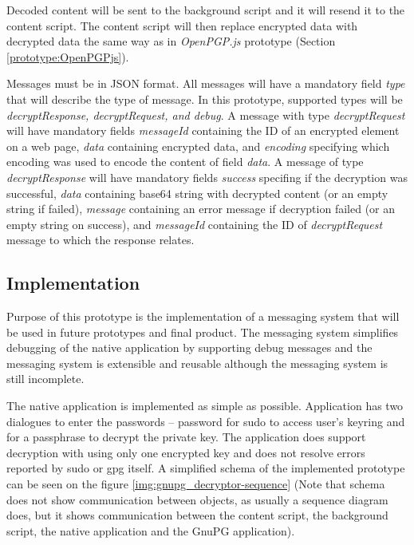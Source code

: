 Decoded content will be sent to the background script and it will resend it to the content script. The content script will then replace encrypted data with decrypted data the same way as in \textit{OpenPGP.js} prototype (Section \ref{prototype:OpenPGPjs}).

Messages must be in JSON format. All messages will have a mandatory field \textit{type} that will describe the type of message. In this prototype, supported types will be \textit{decryptResponse, decryptRequest, and debug}. A message with type \textit{decryptRequest} will have mandatory fields \textit{messageId} containing the ID of an encrypted element on a web page, \textit{data} containing encrypted data, and \textit{encoding} specifying which encoding was used to encode the content of field \textit{data}. A message of type \textit{decryptResponse} will have mandatory fields \textit{success} specifing if the decryption was successful, \textit{data} containing base64 string with decrypted content (or an empty string if failed), \textit{message} containing an error message if decryption failed (or an empty string on success), and \textit{messageId} containing the ID of \textit{decryptRequest} message to which the response relates.

\subsection{Implementation}
Purpose of this prototype is the implementation of a messaging system that will be used in future prototypes and final product. The messaging system simplifies debugging of the native application by supporting debug messages and the messaging system is extensible and reusable although the messaging system is still incomplete.

The native application is implemented as simple as possible. Application has two dialogues to enter the passwords -- password for sudo to access user's keyring and for a passphrase to decrypt the private key. The application does support decryption with using only one encrypted key and does not resolve errors reported by sudo or gpg itself. A simplified schema of the implemented prototype can be seen on the figure \ref{img:gnupg_decryptor-sequence} (Note that schema does not show communication between objects, as usually a sequence diagram does, but it shows communication between the content script, the background script, the native application and the GnuPG application).


